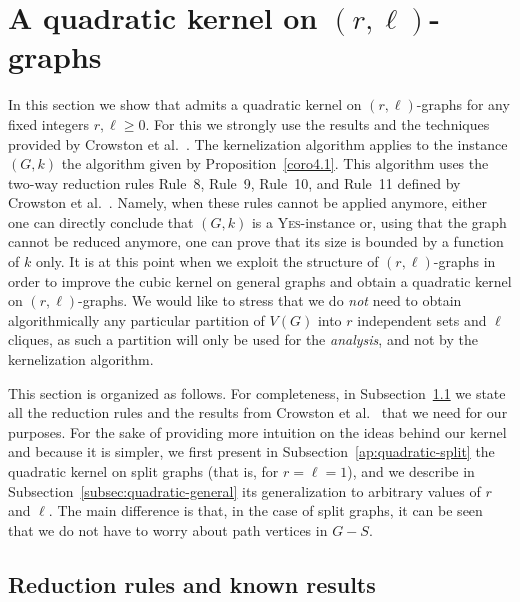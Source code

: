 \documentclass[
final
]{dmtcs-episciences}
\begin{document}
\section{A quadratic kernel on $(r,\ell)$-graphs}
\label{sec:quadratic-kernel}

In this section we show that {} admits a quadratic kernel on $(r,\ell)$-graphs for any fixed integers $r,\ell \geq 0$. For this we strongly use the results and the techniques provided by Crowston et al.~\cite{crowston2013maximum}. The kernelization algorithm applies to the instance $(G,k)$ the algorithm given by Proposition~\ref{coro4.1}. This algorithm uses the two-way reduction rules Rule~8, Rule~9, Rule~10, and Rule~11 defined by Crowston et al.~\cite{crowston2013maximum}. Namely, when these rules cannot be applied anymore, either one can directly conclude that $(G,k)$ is a  \textsc{Yes}-instance or, using that the graph cannot be reduced anymore, one can prove that its size is bounded by a function of $k$ only. It is at this point when we exploit the structure of $(r,\ell)$-graphs in order to improve the cubic kernel on general graphs and obtain a quadratic kernel on $(r,\ell)$-graphs. We would like to stress that we do {\sl not} need to obtain algorithmically any particular partition of $V(G)$ into $r$ independent sets and $\ell$ cliques, as such a partition will only be used for the {\sl analysis}, and not by the kernelization algorithm.



This section is organized as follows. For completeness, in Subsection~\ref{sec:rules} we state all the reduction rules and the results from Crowston et al.~\cite{crowston2013maximum} that we need for our purposes. For the sake of providing more intuition on the ideas behind our kernel and because it is simpler, we first present in Subsection~\ref{ap:quadratic-split} the quadratic kernel on split graphs (that is, for $r=\ell= 1$), and we describe in Subsection~\ref{subsec:quadratic-general} its generalization to arbitrary values of $r$ and $\ell$. The main difference is that, in the case of split graphs, it can be seen that we do not have to worry about path vertices in $G-S$.

\subsection{Reduction rules and known results}
\label{sec:rules}
\end{document}
